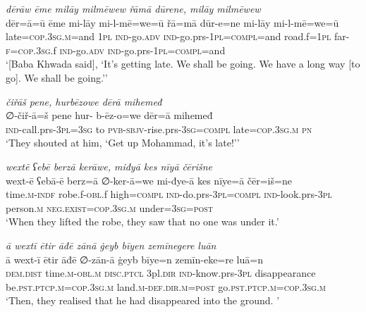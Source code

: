 \ea \label{BP.191}
\textit{dērāw ēme milāy milmēwew řāmā dūrene, milāy milmēwew} \\ 
\gll dēr=ā=ū ēme mi-lāy mi-l-mē=we=ū řā=mā dūr-e=ne mi-lāy mi-l-mē=we=ū \\ 
 late\textsc{=cop}\textsc{.3sg}\textsc{.m}=and \textsc{1pl} \textsc{ind-}go\textsc{.adv} \textsc{ind-}go.prs\textsc{-\textsc{1pl}}\textsc{=compl}=and road.f\textsc{=\textsc{1pl}} far\textsc{-f}\textsc{=cop}\textsc{.3sg}.f \textsc{ind-}go\textsc{.adv} \textsc{ind-}go.prs\textsc{-\textsc{1pl}}\textsc{=compl}=and \\ 
\glt `[Baba Khwada said], ‘It’s getting late. We shall be going. We have a long way [to go]. We shall be going.’'
\z 
 
\ea \label{BP.192}
\textit{čiřāš pene, hurbēzowe dērā mihemeđ} \\ 
\gll ∅-čiř-ā=š pene hur- b-ēz-o=we dēr=ā mihemeđ \\ 
 \textsc{ind-}call.prs\textsc{-3pl}\textsc{=3sg} to \textsc{pvb-}\textsc{sbjv-}rise.prs\textsc{-3sg}\textsc{=compl} late\textsc{=cop}\textsc{.3sg}\textsc{.m} \textsc{pn} \\ 
\glt `They shouted at him, ‘Get up Mohammad, it’s late!’'
\z 
 
\ea \label{BP.194}
\textit{wextē ʕebē berzā kerāwe, miđyā kes nīyā čērišne} \\ 
\gll wext-ē ʕebā-ē berz=ā ∅-ker-ā=we mi-đye-ā kes nīye=ā čēr=iš=ne \\ 
 time\textsc{.m}\textsc{-indf} robe.f\textsc{-obl}.f high\textsc{=compl} \textsc{ind-}do.prs\textsc{-3pl}\textsc{=compl} \textsc{ind-}look.prs\textsc{-3pl} person\textsc{.m} \textsc{\textsc{neg.}exist}\textsc{=cop}\textsc{.3sg}\textsc{.m} under\textsc{=3sg}\textsc{=\textsc{post}} \\ 
\glt `When they lifted the robe, they saw that no one was under it.'
\z 
 
\ea \label{BP.197}
\textit{ā wextī ētir āđē zānā ġeyb bīyen zemīnegere luān} \\ 
\gll ā wext-ī ētir āđē ∅-zān-ā ġeyb bīye=n zemīn-eke=re luā=n \\ 
 \textsc{dem.dist} time\textsc{.m}\textsc{-obl}\textsc{.m} \textsc{disc.ptcl} 3pl\textsc{.dir} \textsc{ind-}know.prs\textsc{-3pl} disappearance be\textsc{.pst}\textsc{.ptcp}\textsc{.m}\textsc{=cop}\textsc{.3sg}\textsc{.m} land\textsc{.m}\textsc{-def}\textsc{.dir}\textsc{.m}\textsc{=\textsc{post}} go\textsc{.pst}\textsc{.ptcp}\textsc{.m}\textsc{=cop}\textsc{.3sg}\textsc{.m} \\ 
\glt `Then, they realised that he had disappeared into the ground. '
\z 
 
